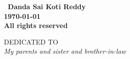 \documentclass[oneside,12pt]{./thesisStyle/IIScthesisPSnPDF}
\newcommand{\blankpage}{
\newpage
\thispagestyle{empty}
\mbox{}
\newpage
}
\newcommand{\blankpagewithnumber}{
\newpage
\mbox{}
\newpage
}
\begin{document}
\blankpage

\vspace*{\fill}
\begin{center}
\large\bf \textcopyright \ Danda Sai Koti Reddy\\
\large\bf \monthyeardate\today\\
\large\bf All rights reserved
\end{center}
\vspace*{\fill}
\thispagestyle{empty}

\blankpage

\vspace*{\fill}
\begin{center}
DEDICATED TO \\[2em]
\Large\it My parents and sister and brother-in-law%
\end{center}
\vspace*{\fill}
\thispagestyle{empty}

%

\setcounter{secnumdepth}{3}
\setcounter{tocdepth}{3}
\frontmatter %
% 



\tableofcontents
\listoffigures
\listoftables
\mainmatter %
\setcounter{page}{1}

%

%
%







\end{document}
